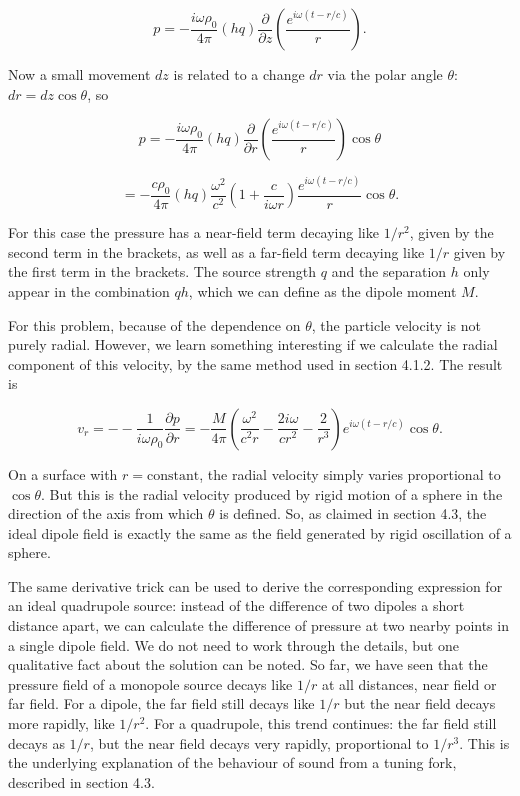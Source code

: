   $$p=-\dfrac{i \omega \rho_0 }{4 \pi} (hq) \dfrac{\partial}{\partial z} \left( 
  \dfrac{e^{i \omega(t-r/c)}}{r} \right) . \tag{4}$$ 

  Now a small movement $dz$ is related to a change $dr$ via the polar angle 
  $\theta$: $dr=dz \cos \theta$, so 

  $$p=-\dfrac{i \omega \rho_0}{4 \pi} (hq) \dfrac{\partial}{\partial r} \left( 
  \dfrac{e^{i \omega(t-r/c)}}{r} \right) \cos \theta \tag{5}$$ 

  $$=-\dfrac{c \rho_0 }{4 \pi} (hq) \dfrac{\omega^2}{c^2} \left( 1+ \dfrac{c}{i 
  \omega r}\right) \dfrac{e^{i \omega(t-r/c)}}{r} \cos \theta .\tag{6}$$ 

  For this case the pressure has a near-field term decaying like $1/r^2$, given 
  by the second term in the brackets, as well as a far-field term decaying like 
  $1/r$ given by the first term in the brackets. The source strength $q$ and 
  the separation $h$ only appear in the combination $qh$, which we can define 
  as the dipole moment $M$. 

  For this problem, because of the dependence on $\theta$, the particle 
  velocity is not purely radial. However, we learn something interesting if we 
  calculate the radial component of this velocity, by the same method used in 
  section 4.1.2. The result is 

  $$v_r = -- \dfrac{1}{i \omega \rho_0} \dfrac{\partial p}{\partial r} = 
  -\dfrac{M}{4 \pi} \left(\dfrac{\omega^2}{c^2 r} -\dfrac{2 i \omega}{c r^2} 
  -\dfrac{2}{r^3} \right) e^{i \omega(t-r/c)} \cos \theta . \tag{7}$$ 

  On a surface with $r=\mathrm{constant}$, the radial velocity simply varies 
  proportional to $\cos \theta$. But this is the radial velocity produced by 
  rigid motion of a sphere in the direction of the axis from which $\theta$ is 
  defined. So, as claimed in section 4.3, the ideal dipole field is exactly the 
  same as the field generated by rigid oscillation of a sphere. 

  The same derivative trick can be used to derive the corresponding expression 
  for an ideal quadrupole source: instead of the difference of two dipoles a 
  short distance apart, we can calculate the difference of pressure at two 
  nearby points in a single dipole field. We do not need to work through the 
  details, but one qualitative fact about the solution can be noted. So far, we 
  have seen that the pressure field of a monopole source decays like $1/r$ at 
  all distances, near field or far field. For a dipole, the far field still 
  decays like $1/r$ but the near field decays more rapidly, like $1/r^2$. For a 
  quadrupole, this trend continues: the far field still decays as $1/r$, but 
  the near field decays very rapidly, proportional to $1/r^3$. This is the 
  underlying explanation of the behaviour of sound from a tuning fork, 
  described in section 4.3. 